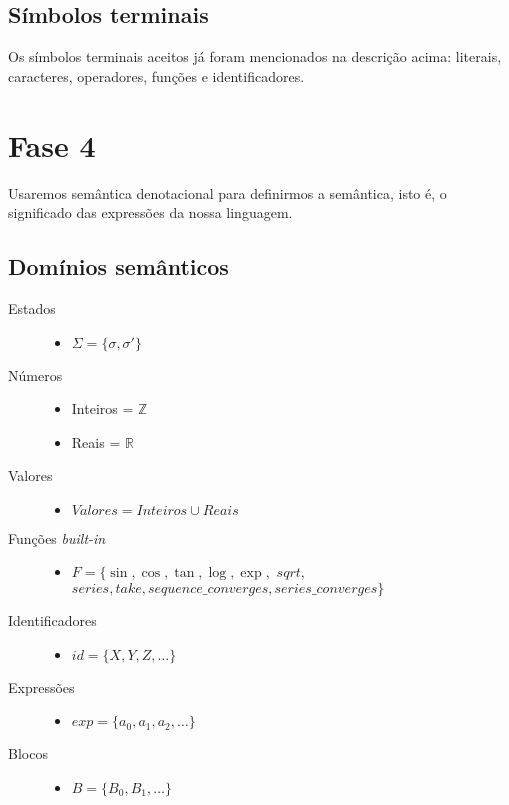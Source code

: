 \documentclass[a4 paper, 12pt]{article}
\begin{document}
\subsection{S\'imbolos terminais}
Os s\'imbolos terminais aceitos j\'a foram mencionados na descri\c
c\~ao acima: literais, caracteres, operadores, fun\c c\~oes e
identificadores.

\section{Fase 4}
Usaremos sem\^antica denotacional para definirmos a sem\^antica, isto
\'e, o significado das express\~oes da nossa linguagem.

\subsection{Dom\'inios sem\^anticos}
\begin{description}
\item[Estados]\hfill
  \begin{itemize}
  \item $\Sigma = \{\sigma, \sigma '\}$
  \end{itemize}
\item[N\'umeros]\hfill
  \begin{itemize}
  \item Inteiros = $\mathbb{Z}$
  \item Reais = $\mathbb{R}$
  \end{itemize}
\item[Valores]\hfill
  \begin{itemize}
  \item $Valores = Inteiros \cup Reais$
  \end{itemize}
\item[Fun\c c\~oes \emph{built-in}]\hfill
  \begin{itemize}
  \item $F = \{\sin, \cos, \tan, \log, \exp,$ $sqrt$, \\$series, take, sequence\_converges, series\_converges\}$
  \end{itemize}
\item[Identificadores]\hfill
  \begin{itemize}
  \item $id = \{X, Y, Z, \ldots\}$
  \end{itemize}
\item[Express\~oes]\hfill
  \begin{itemize}
  \item $exp = \{a_0, a_1, a_2, \ldots\}$
  \end{itemize}
\item[Blocos]\hfill
  \begin{itemize}
  \item $B = \{B_0, B_1, \ldots \}$
  \end{itemize}
\end{description}
\end{document}
